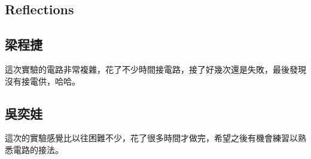 \documentclass{article}
\begin{document}
\begin{CJK*}{UTF8}{bkai}
\section*{Reflections}
\subsection*{梁程捷}
這次實驗的電路非常複雜，花了不少時間接電路，接了好幾次還是失敗，最後發現沒有接電供，哈哈。
\subsection*{吳奕娃}
這次的實驗感覺比以往困難不少，花了很多時間才做完，希望之後有機會練習以熟悉電路的接法。
\end{CJK*}
\end{document}
